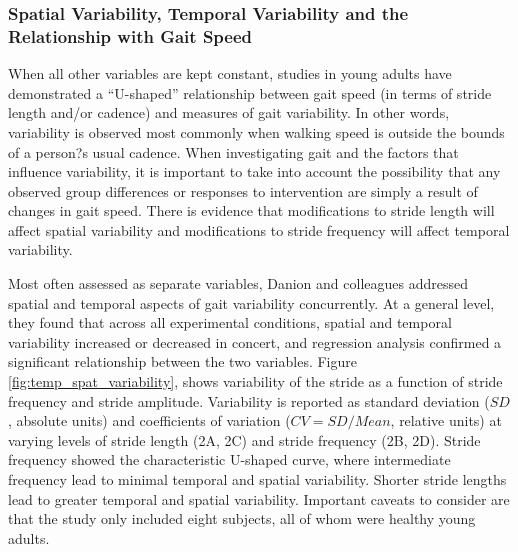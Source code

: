 \documentclass[11pt, oneside]{report}   	%
\begin{document}
\subsubsection{Spatial Variability, Temporal Variability and the Relationship with Gait Speed}

When all other variables are kept constant, studies in young adults have demonstrated a ``U-shaped'' relationship between gait speed (in terms of stride length and/or cadence) and measures of gait variability\cite{Hausdorff2005}. In other words, variability is observed most commonly when walking speed is outside the bounds of a person?s usual cadence. When investigating gait and the factors that influence variability, it is important to take into account the possibility that any observed group differences or responses to intervention are simply a result of changes in gait speed\cite{Hausdorff2005}. There is evidence that modifications to stride length will affect spatial variability\cite{Sekiya1997} and modifications to stride frequency will affect  temporal variability\cite{Maruyama1992}.

Most often assessed as separate variables, Danion and colleagues\cite{Danion2003} addressed spatial and temporal aspects of gait variability concurrently. At a general level, they found that across all experimental conditions, spatial and temporal variability increased or decreased in concert, and regression analysis confirmed a significant relationship between the two variables\cite{Danion2003}. Figure \ref{fig:temp_spat_variability}, shows variability of the stride as a function of stride frequency and stride amplitude. Variability is reported as standard deviation ($SD$, absolute units) and coefficients of variation ($CV = SD/Mean$, relative units) at varying levels of stride length (2A, 2C) and stride frequency (2B, 2D). Stride frequency showed the characteristic U-shaped curve, where intermediate frequency lead to minimal temporal and spatial variability. Shorter stride lengths lead to greater temporal and spatial variability\cite{Danion2003}. Important caveats to consider are that the study only included eight subjects, all of whom were healthy young adults.
\end{document}
